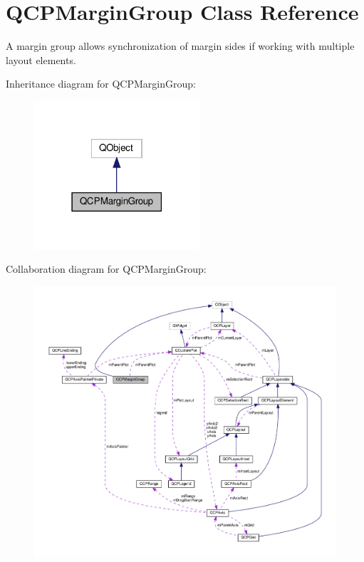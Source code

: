 \hypertarget{classQCPMarginGroup}{}\section{Q\+C\+P\+Margin\+Group Class Reference}
\label{classQCPMarginGroup}


A margin group allows synchronization of margin sides if working with multiple layout elements.  




Inheritance diagram for Q\+C\+P\+Margin\+Group\+:\nopagebreak
\begin{figure}[H]
\begin{center}
\leavevmode
\includegraphics[width=174pt]{classQCPMarginGroup__inherit__graph}
\end{center}
\end{figure}


Collaboration diagram for Q\+C\+P\+Margin\+Group\+:\nopagebreak
\begin{figure}[H]
\begin{center}
\leavevmode
\includegraphics[width=350pt]{classQCPMarginGroup__coll__graph}
\end{center}
\end{figure}
